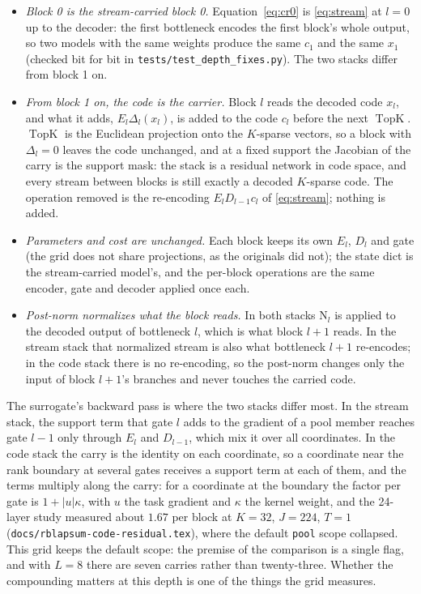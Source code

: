 \documentclass[11pt,a4paper]{article}
\newcommand{\code}[1]{\texttt{#1}}
\newcommand{\TopK}{\operatorname{TopK}}
\begin{document}
\begin{itemize}[leftmargin=1.4em]
\item \emph{Block 0 is the stream-carried block 0.} Equation~\eqref{eq:cr0}
is \eqref{eq:stream} at $l = 0$ up to the decoder: the first bottleneck
encodes the first block's whole output, so two models with the same weights
produce the same $c_1$ and the same $x_1$ (checked bit for bit in
\code{tests/test\_depth\_fixes.py}). The two stacks differ from block 1 on.
\item \emph{From block 1 on, the code is the carrier.} Block $l$ reads the
decoded code $x_l$, and what it adds, $E_l \Delta_l(x_l)$, is added to the
code $c_l$ before the next $\TopK$. $\TopK$ is the Euclidean projection onto
the $K$-sparse vectors, so a block with $\Delta_l = 0$ leaves the code
unchanged, and at a fixed support the Jacobian of the carry is the support
mask: the stack is a residual network in code space, and every stream between
blocks is still exactly a decoded $K$-sparse code. The operation removed is
the re-encoding $E_l D_{l-1} c_l$ of \eqref{eq:stream}; nothing is added.
\item \emph{Parameters and cost are unchanged.} Each block keeps its own
$E_l$, $D_l$ and gate (the grid does not share projections, as the originals
did not); the state dict is the stream-carried model's, and the per-block
operations are the same encoder, gate and decoder applied once each.
\item \emph{Post-norm normalizes what the block reads.} In both stacks
$\mathrm{N}_l$ is applied to the decoded output of bottleneck $l$, which is
what block $l+1$ reads. In the stream stack that normalized stream is also
what bottleneck $l+1$ re-encodes; in the code stack there is no re-encoding,
so the post-norm changes only the input of block $l+1$'s branches and never
touches the carried code.
\end{itemize}

The surrogate's backward pass is where the two stacks differ most. In the
stream stack, the support term that gate $l$ adds to the gradient of a
pool member reaches gate $l-1$ only through $E_l$ and $D_{l-1}$, which mix
it over all coordinates. In the code stack the carry is the identity on each
coordinate, so a coordinate near the rank boundary at several gates
receives a support term at each of them, and the terms multiply along the
carry: for a coordinate at the boundary the factor per gate is
$1 + |u|\kappa$, with $u$ the task gradient and $\kappa$ the kernel weight,
and the 24-layer study measured about $1.67$ per block at $K = 32$, $J = 224$,
$T = 1$ (\code{docs/rblapsum-code-residual.tex}), where the default
\code{pool} scope collapsed. This grid keeps the default scope: the premise
of the comparison is a single flag, and with $L = 8$ there are seven carries
rather than twenty-three. Whether the compounding matters at this depth is
one of the things the grid measures.
\end{document}
